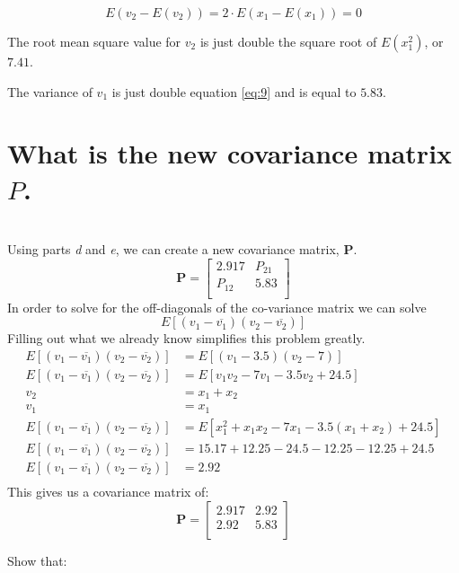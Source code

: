 \documentclass[12pt,letterpaper, onecolumn]{exam}
\begin{document}
\begin{questions}
\begin{parts}
		\begin{equation}
			E(v_2 - E(v_2)) = 2\cdot E(x_1 - E(x_1)) = 0
		\end{equation}

		The root mean square value for $v_2$ is just double the square root of $E(x_1^2)$, or $7.41$.

		The variance of $v_1$ is just double equation \ref{eq:9} and is equal to $5.83$.
		\part{What is the new covariance matrix $P$.}\\
		\solution
		Using parts \textit{d} and \textit{e}, we can create a new covariance matrix, $\mathbf{P}$.
		\begin{equation}
			\mathbf{P} =
			\begin{bmatrix}
				2.917  & P_{21} \\
				P_{12} & 5.83   \\
			\end{bmatrix}
		\end{equation}
		In order to solve for the off-diagonals of the co-variance matrix we can solve
		\[E\left[(v_1 - \overline{v_1})(v_2 - \overline{v_2}) \right] \]
		Filling out what we already know simplifies this problem greatly.
		\begin{equation}
			\begin{split}
				E\left[(v_1 - \overline{v_1})(v_2 - \overline{v_2}) \right] & = E\left[(v_1 - 3.5)(v_2 - 7) \right]\\
				E\left[(v_1 - \overline{v_1})(v_2 - \overline{v_2}) \right] & = E\left[v_1v_2 - 7v_1 - 3.5v_2 + 24.5\right]\\
				v_2 & = x_1 + x_2\\
				v_1 & = x_1\\
				E\left[(v_1 - \overline{v_1})(v_2 - \overline{v_2}) \right] & = E\left[x_1^2 + x_1x_2 - 7x_1 - 3.5(x_1 + x_2) + 24.5\right]\\
				E\left[(v_1 - \overline{v_1})(v_2 - \overline{v_2}) \right] & = 15.17 + 12.25 - 24.5 - 12.25 - 12.25 + 24.5\\
				E\left[(v_1 - \overline{v_1})(v_2 - \overline{v_2}) \right] & = 2.92\\
			\end{split}
		\end{equation}
		This gives us a covariance matrix of:
		\begin{equation}
			\mathbf{P} =
			\begin{bmatrix}
				2.917 & 2.92 \\
				2.92  & 5.83 \\
			\end{bmatrix}
		\end{equation}
	\end{parts}
	\clearpage
	 Show that:
	\begin{parts}

\end{parts}
\end{questions}
\end{document}
